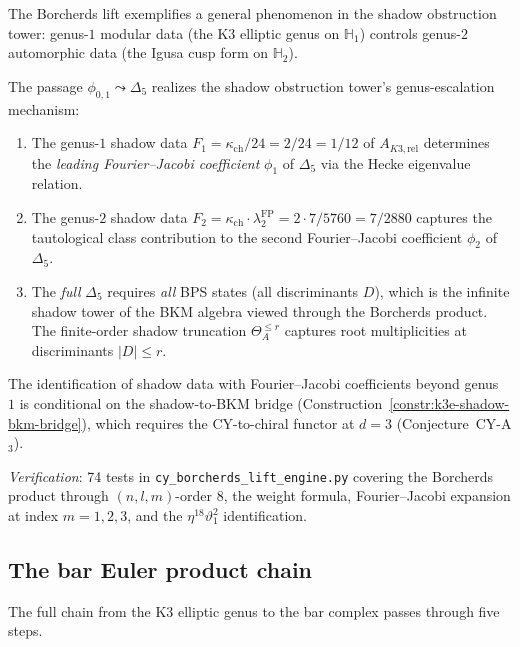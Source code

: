 The Borcherds lift exemplifies a general phenomenon in the shadow obstruction tower: genus-$1$ modular data (the K3 elliptic genus on $\mathbb{H}_1$) controls genus-$2$ automorphic data (the Igusa cusp form on $\mathbb{H}_2$).

\begin{proposition}
\label{prop:k3e-genus-escalation}
The passage $\phi_{0,1} \leadsto \Delta_5$ realizes the shadow obstruction tower's genus-escalation mechanism:
\begin{enumerate}[label=(\roman*)]
 \item The genus-$1$ shadow data $F_1 = \kappa_{\mathrm{ch}} / 24 = 2/24 = 1/12$ of $A_{K3,\mathrm{rel}}$ determines the \emph{leading Fourier--Jacobi coefficient} $\phi_1$ of $\Delta_5$ via the Hecke eigenvalue relation.
 \item The genus-$2$ shadow data $F_2 = \kappa_{\mathrm{ch}} \cdot \lambda_2^{\mathrm{FP}} = 2 \cdot 7/5760 = 7/2880$ captures the tautological class contribution to the second Fourier--Jacobi coefficient $\phi_2$ of $\Delta_5$.
 \item The \emph{full} $\Delta_5$ requires \emph{all} BPS states (all discriminants $D$), which is the infinite shadow tower of the BKM algebra viewed through the Borcherds product. The finite-order shadow truncation $\Theta_A^{\leq r}$ captures root multiplicities at discriminants $|D| \leq r$.
\end{enumerate}
The identification of shadow data with Fourier--Jacobi coefficients beyond genus~$1$ is conditional on the shadow-to-BKM bridge (Construction~\ref{constr:k3e-shadow-bkm-bridge}), which requires the CY-to-chiral functor at $d = 3$ (Conjecture~CY-A$_3$).
\end{proposition}

\noindent\textit{Verification}: 74 tests in \texttt{cy\_borcherds\_lift\_engine.py} covering the Borcherds product through $(n,l,m)$-order $8$, the weight formula, Fourier--Jacobi expansion at index $m = 1,2,3$, and the $\eta^{18}\vartheta_1^2$ identification.

\subsection{The bar Euler product chain}
\label{subsec:k3e-bar-euler-chain}

The full chain from the K3 elliptic genus to the bar complex
passes through five steps.

